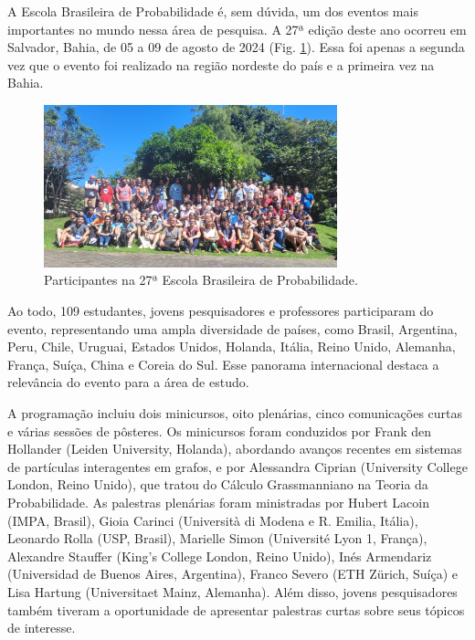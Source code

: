 \documentclass{hipatia}
\begin{document}
A Escola Brasileira de Probabilidade é, sem dúvida, um dos eventos mais importantes no mundo nessa área de pesquisa. 
A 27ª edição deste ano ocorreu em Salvador, Bahia, de 05 a 09 de agosto de 2024 (Fig. \ref{EBP}). 
Essa foi apenas a segunda vez que o evento foi realizado na região nordeste do país e a primeira vez na Bahia.
\begin{figure}[htb]
    \centering
    \includegraphics[width=8.5cm]{EBP.jpg}
    \caption{Participantes na 27ª Escola Brasileira de Probabilidade.}
 \label{EBP}
\end{figure}

Ao todo, 109 estudantes, jovens pesquisadores e professores participaram do evento, representando uma ampla diversidade de países, como Brasil, Argentina, Peru, Chile, Uruguai, Estados Unidos, Holanda, Itália, Reino Unido, Alemanha, França, Suíça, China e Coreia do Sul. 
Esse panorama internacional destaca a relevância do evento para a área de estudo. 

A programação incluiu dois minicursos, oito plenárias, cinco comunicações curtas e várias sessões de pôsteres. 
Os minicursos foram conduzidos por Frank den Hollander (Leiden University, Holanda), abordando avanços recentes em sistemas de partículas interagentes em grafos, e por Alessandra Ciprian (University College London, Reino Unido), que tratou do Cálculo Grassmanniano na Teoria da Probabilidade. 
As palestras plenárias foram ministradas por Hubert Lacoin (IMPA, Brasil), Gioia Carinci (Università di Modena e R. Emilia, Itália), Leonardo Rolla (USP, Brasil), Marielle Simon (Université Lyon 1, França), Alexandre Stauffer (King's College London, Reino Unido), Inés Armendariz (Universidad de Buenos Aires, Argentina), Franco Severo (ETH Z\"{u}rich, Suíça) e Lisa Hartung (Universitaet Mainz, Alemanha). 
Além disso, jovens pesquisadores também tiveram a oportunidade de apresentar palestras curtas sobre seus tópicos de interesse.
\end{document}
